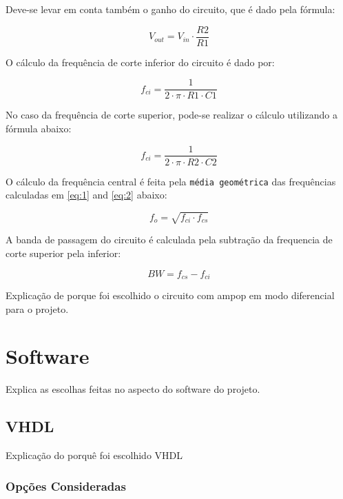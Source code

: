 	Deve-se levar em conta também o ganho do circuito, que é dado pela fórmula:
	
	\begin{equation}
		V_{out} = V_{in} \cdot \frac{R2}{R1}
	\end{equation}
	
	O cálculo da frequência de corte inferior do circuito é dado por: 
	
	\begin{equation} \label{eq:1}
		f_{ci} = \frac{1}{2 \cdot \pi \cdot R1 \cdot C1}
	\end{equation}
	
	No caso da frequência de corte superior, pode-se realizar o cálculo utilizando a fórmula abaixo:
	
	\begin{equation} \label{eq:2}
		f_{ci} = \frac{1}{2 \cdot \pi \cdot R2 \cdot C2}
	\end{equation}
	
	O cálculo da frequência central é feita pela \texttt{média geométrica} das frequências calculadas em \ref{eq:1} and \ref{eq:2} abaixo: 
	
	\begin{equation} \label{eq:3}
		f_{o} = \sqrt{f_{ci} \cdot f_{cs}}
	\end{equation}
	
	A banda de passagem do circuito é calculada pela subtração da frequencia de corte superior pela inferior:
	
	\begin{equation} \label{eq:4}
		BW = f_{cs} - f_{ci}
	\end{equation}
	
	Explicação de porque foi escolhido o circuito com ampop em modo diferencial para o projeto.
	
	\section{Software}\label{sec-software}
	
	Explica as escolhas feitas no aspecto do software do projeto.
	
	\subsection{VHDL}\label{soft-vhdl}
	
	Explicação do porquê foi escolhido VHDL
	
	\subsubsection{Opções Consideradas}\label{vhdl-options}
	
